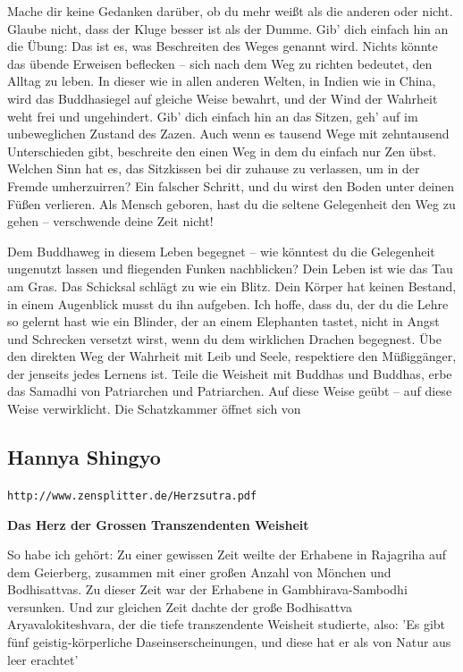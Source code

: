 \documentclass[10pt,a4paper]{article}
\begin{document}
\vskip 4pt
Mache dir keine Gedanken darüber, ob du mehr weißt als die anderen oder nicht. Glaube nicht, dass der Kluge
besser ist als der Dumme. Gib’ dich einfach hin an die Übung: Das ist es, was Beschreiten des Weges genannt wird.
Nichts könnte das übende Erweisen beflecken – sich nach dem Weg zu richten bedeutet, den Alltag zu leben. In
dieser wie in allen anderen Welten, in Indien wie in China, wird das Buddhasiegel auf gleiche Weise bewahrt, und
der Wind der Wahrheit weht frei und ungehindert. Gib’ dich einfach hin an das Sitzen, geh’ auf im unbeweglichen
Zustand des Zazen. Auch wenn es tausend Wege mit zehntausend Unterschieden gibt, beschreite den einen Weg
in dem du einfach nur Zen übst. Welchen Sinn hat es, das Sitzkissen bei dir zuhause zu verlassen, um in der
Fremde umherzuirren? Ein falscher Schritt, und du wirst den Boden unter deinen Füßen verlieren. Als Mensch
geboren, hast du die seltene Gelegenheit den Weg zu gehen – verschwende deine Zeit nicht!

\vskip 4pt
Dem Buddhaweg in diesem Leben begegnet – wie könntest du die Gelegenheit ungenutzt lassen und fliegenden
Funken nachblicken? Dein Leben ist wie das Tau am Gras. Das Schicksal schlägt zu wie ein Blitz. Dein Körper hat
keinen Bestand, in einem Augenblick musst du ihn aufgeben. Ich hoffe, dass du, der du die Lehre so gelernt hast
wie ein Blinder, der an einem Elephanten tastet, nicht in Angst und Schrecken versetzt wirst, wenn du dem
wirklichen Drachen begegnest. Übe den direkten Weg der Wahrheit mit Leib und Seele, respektiere den
Müßiggänger, der jenseits jedes Lernens ist. Teile die Weisheit mit Buddhas und Buddhas, erbe das Samadhi von
Patriarchen und Patriarchen. Auf diese Weise geübt – auf diese Weise verwirklicht. Die Schatzkammer öffnet sich
von 

\newpage
\subsection{Hannya Shingyo}

\verb+http://www.zensplitter.de/Herzsutra.pdf+

\vskip 4pt
{\bf Das Herz der Grossen Transzendenten Weisheit}

\vskip 4pt
So habe ich gehört: Zu einer gewissen Zeit weilte der Erhabene in Rajagriha
auf dem Geierberg, zusammen mit einer großen Anzahl von Mönchen und
Bodhisattvas. Zu dieser Zeit war der Erhabene in Gambhirava-Sambodhi
versunken. Und zur gleichen Zeit dachte der große Bodhisattva
Aryavalokiteshvara, der die tiefe transzendente Weisheit studierte, also: 'Es
gibt fünf geistig-körperliche Daseinserscheinungen, und diese hat er als von
Natur aus leer erachtet'
\end{document}
